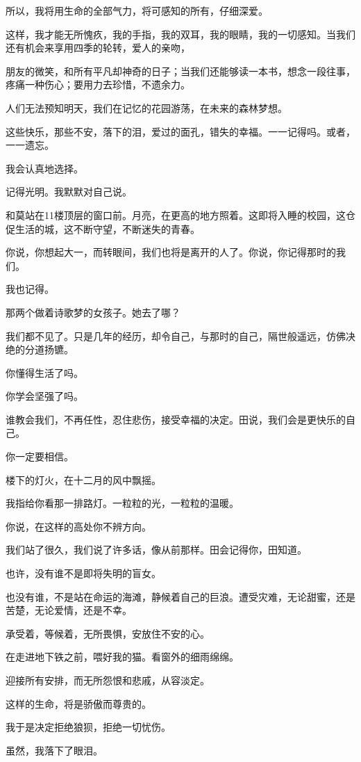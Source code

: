 		所以，我将用生命的全部气力，将可感知的所有，仔细深爱。

		这样，我才能无所愧疚，我的手指，我的双耳，我的眼睛，我的一切感知。当我们还有机会来享用四季的轮转，爱人的亲吻，\par
		朋友的微笑，和所有平凡却神奇的日子；当我们还能够读一本书，想念一段往事，疼痛一种伤心；要用力去珍惜，不遗余力。\par
		人们无法预知明天，我们在记忆的花园游荡，在未来的森林梦想。\par
		这些快乐，那些不安，落下的泪，爱过的面孔，错失的幸福。一一记得吗。或者，一一遗忘。\par
		我会认真地选择。

		记得光明。我默默对自己说。

		和莫站在11楼顶层的窗口前。月亮，在更高的地方照着。这即将入睡的校园，这仓促生活的城，这不断守望，不断迷失的青春。\par
		你说，你想起大一，而转眼间，我们也将是离开的人了。你说，你记得那时的我们。\par
		我也记得。\par
		那两个做着诗歌梦的女孩子。她去了哪？\par
		我们都不见了。只是几年的经历，却令自己，与那时的自己，隔世般遥远，仿佛决绝的分道扬镳。\par
		你懂得生活了吗。\par
		你学会坚强了吗。\par
		谁教会我们，不再任性，忍住悲伤，接受幸福的决定。田说，我们会是更快乐的自己。\par
		你一定要相信。

		楼下的灯火，在十二月的风中飘摇。\par
		我指给你看那一排路灯。一粒粒的光，一粒粒的温暖。\par
		你说，在这样的高处你不辨方向。\par
		我们站了很久，我们说了许多话，像从前那样。田会记得你，田知道。

		也许，没有谁不是即将失明的盲女。\par
		也没有谁，不是站在命运的海滩，静候着自己的巨浪。遭受灾难，无论甜蜜，还是苦楚，无论爱情，还是不幸。\par
		承受着，等候着，无所畏惧，安放住不安的心。\par
		在走进地下铁之前，喂好我的猫。看窗外的细雨绵绵。\par
		迎接所有安排，而无所怨恨和悲戚，从容淡定。

		这样的生命，将是骄傲而尊贵的。

		我于是决定拒绝狼狈，拒绝一切忧伤。\par
		虽然，我落下了眼泪。

